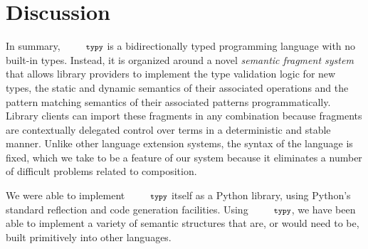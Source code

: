 \documentclass[10pt]{sigplanconf}
\newcommand{\typy}{\texttt{\footnotesize typy}}
\begin{document}
\section{Discussion}\label{sec:discussion}
In summary, $\typy$ is a bidirectionally typed programming language with no built-in types. Instead, it is organized around a novel \emph{semantic fragment system} that allows library providers to implement the type validation logic for new types, the static and dynamic semantics of their associated operations and the pattern matching semantics of their associated patterns programmatically. Library clients can import these fragments in any combination because fragments are contextually delegated control over terms in a deterministic and stable manner. Unlike other language extension systems, the syntax of the language is fixed, which we take to be a feature of our system because it eliminates a number of difficult problems related to composition. 

We were able to implement $\typy$ itself as a Python library, using Python's standard reflection and code generation facilities. Using $\typy$, we have been able to implement a variety of semantic structures that are, or would need to be, built primitively into other languages.


\end{document}
